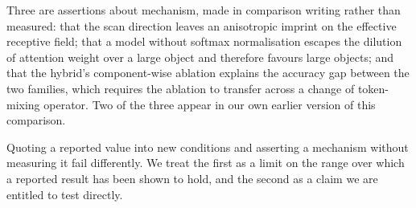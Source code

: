 Three are assertions about mechanism, made in comparison writing rather than
measured: that the scan direction leaves an anisotropic imprint on the
effective receptive field; that a model without softmax normalisation escapes
the dilution of attention weight over a large object and therefore favours
large objects; and that the hybrid's component-wise ablation explains the
accuracy gap between the two families, which requires the ablation to
transfer across a change of token-mixing operator. Two of the three appear in
our own earlier version of this comparison.

Quoting a reported value into new conditions and asserting a mechanism
without measuring it fail differently. We treat the first as a limit on the
range over which a reported result has been shown to hold, and the second as
a claim we are entitled to test directly.
